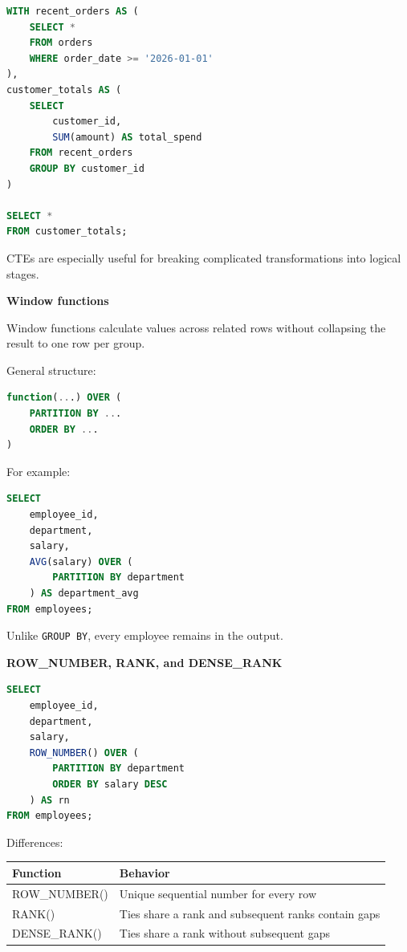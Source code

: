 \documentclass[11pt,letterpaper]{article}
\begin{document}
\begin{lstlisting}[language=SQL]
WITH recent_orders AS (
    SELECT *
    FROM orders
    WHERE order_date >= '2026-01-01'
),
customer_totals AS (
    SELECT
        customer_id,
        SUM(amount) AS total_spend
    FROM recent_orders
    GROUP BY customer_id
)

SELECT *
FROM customer_totals;
\end{lstlisting}

CTEs are especially useful for breaking complicated transformations into
logical stages.

\textbf{Window functions}

Window functions calculate values across related rows without collapsing the
result to one row per group.

General structure:

\begin{lstlisting}[language=SQL]
function(...) OVER (
    PARTITION BY ...
    ORDER BY ...
)
\end{lstlisting}

For example:

\begin{lstlisting}[language=SQL]
SELECT
    employee_id,
    department,
    salary,
    AVG(salary) OVER (
        PARTITION BY department
    ) AS department_avg
FROM employees;
\end{lstlisting}

Unlike \texttt{GROUP BY}, every employee remains in the output.

\textbf{ROW\_NUMBER, RANK, and DENSE\_RANK}

\begin{lstlisting}[language=SQL]
SELECT
    employee_id,
    department,
    salary,
    ROW_NUMBER() OVER (
        PARTITION BY department
        ORDER BY salary DESC
    ) AS rn
FROM employees;
\end{lstlisting}

Differences:

\begin{center}
\begin{tabularx}{\textwidth}{lX}
\toprule
Function & Behavior \\
\midrule
ROW\_NUMBER() & Unique sequential number for every row \\
RANK() & Ties share a rank and subsequent ranks contain gaps \\
DENSE\_RANK() & Ties share a rank without subsequent gaps \\
\bottomrule
\end{tabularx}
\end{center}
\end{document}
